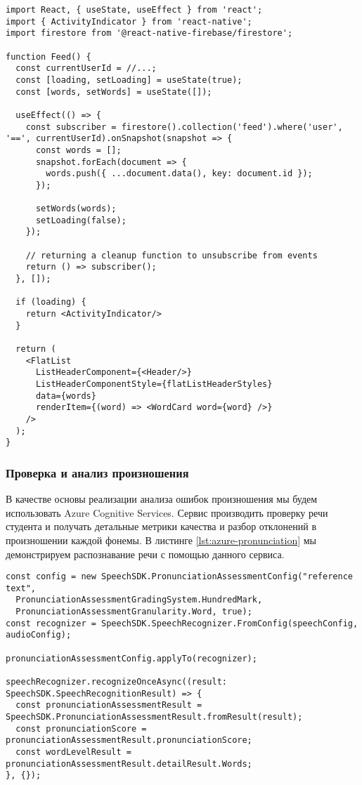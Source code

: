\begin{lstlisting}[basicstyle=\fontsize{11}{11}\selectfont,tabsize=4,breaklines=true,caption={Загрузка и синхронизация данных с Firestore.},captionpos=b,label={lst:feed-screen-firestore}]
import React, { useState, useEffect } from 'react';
import { ActivityIndicator } from 'react-native';
import firestore from '@react-native-firebase/firestore';

function Feed() {
  const currentUserId = //...;
  const [loading, setLoading] = useState(true);
  const [words, setWords] = useState([]);
  
  useEffect(() => {
    const subscriber = firestore().collection('feed').where('user', '==', currentUserId).onSnapshot(snapshot => {
      const words = [];
      snapshot.forEach(document => {
        words.push({ ...document.data(), key: document.id });
      });
      
      setWords(words);
      setLoading(false);
    });
    
    // returning a cleanup function to unsubscribe from events
    return () => subscriber();
  }, []);
  
  if (loading) {
    return <ActivityIndicator/>
  }
  
  return (
    <FlatList
      ListHeaderComponent={<Header/>}
      ListHeaderComponentStyle={flatListHeaderStyles}
      data={words}
      renderItem={(word) => <WordCard word={word} />}
    />
  );
}
\end{lstlisting}


\subsubsection{Проверка и анализ произношения}
В качестве основы реализации анализа ошибок произношения мы будем использовать Azure Cognitive Services. Сервис производить проверку речи студента и получать детальные метрики качества и разбор отклонений в произношении каждой фонемы. В листинге \ref{lst:azure-pronunciation} мы демонстрируем распознавание речи с помощью данного сервиса.

\begin{lstlisting}[basicstyle=\fontsize{11}{11}\selectfont,tabsize=4,breaklines=true,caption={Пример проверки произношения с помощью Azure.},captionpos=b,label={lst:azure-pronunciation}]
const config = new SpeechSDK.PronunciationAssessmentConfig("reference text",
  PronunciationAssessmentGradingSystem.HundredMark,
  PronunciationAssessmentGranularity.Word, true);
const recognizer = SpeechSDK.SpeechRecognizer.FromConfig(speechConfig, audioConfig);

pronunciationAssessmentConfig.applyTo(recognizer);

speechRecognizer.recognizeOnceAsync((result: SpeechSDK.SpeechRecognitionResult) => {
  const pronunciationAssessmentResult = SpeechSDK.PronunciationAssessmentResult.fromResult(result);
  const pronunciationScore = pronunciationAssessmentResult.pronunciationScore;
  const wordLevelResult = pronunciationAssessmentResult.detailResult.Words;
}, {});
\end{lstlisting}

